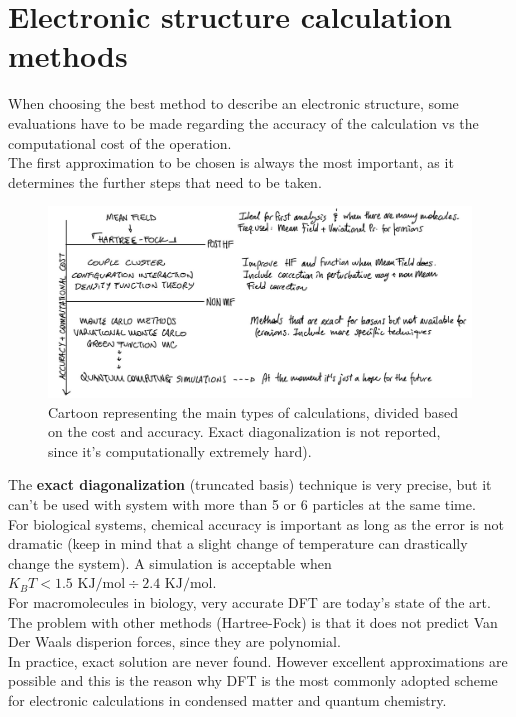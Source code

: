 \section{Electronic structure calculation methods}
When choosing the best method to describe an electronic structure, some evaluations have to be made regarding the accuracy of the calculation vs the computational cost of the operation. \\
The first approximation to be chosen is always the most important, as it determines the further steps that need to be taken. \\
\begin{figure}[htbp!]
	\centering
	\includegraphics[scale=0.30]{img_13}
	\caption{Cartoon representing the main types of calculations, divided based on the cost and accuracy. Exact diagonalization is not reported, since it's computationally extremely hard). }
\label{fig:calculations}
\end{figure}
\newline
The \textbf{exact diagonalization} (truncated basis) technique is very precise, but it can't be used with system with more than 5 or 6 particles at the same time.\\
For biological systems, chemical accuracy is important as long as the error is not dramatic (keep in mind that a slight change of temperature can drastically change the system). A simulation is acceptable when $K_BT < 1.5\text{ KJ/mol} \div 2.4 \text{ KJ/mol}$.\\
For macromolecules in biology, very accurate DFT are today's state of the art. The problem with other methods (Hartree-Fock) is that it does not predict Van Der Waals disperion forces, since they are polynomial. 
\\
In practice, exact solution are never found. However excellent approximations are possible and this is the reason why DFT is the most commonly adopted scheme for electronic calculations in condensed matter and quantum chemistry.\\

